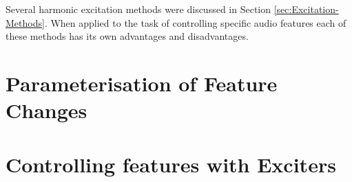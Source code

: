 
	Several harmonic excitation methods were discussed in Section \ref{sec:Excitation-Methods}. When applied to the task of controlling specific audio features each of these methods has its own advantages and disadvantages.

\section{Parameterisation of Feature Changes}
\label{sec:FeatureControl-Parameterisation}

\section{Controlling features with Exciters}
\label{sec:FeatureControl-Control}
